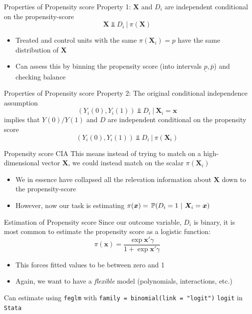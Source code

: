 \documentclass[aspectratio=169,t,11pt,table]{beamer}
\begin{document}
\begin{frame}{Properties of Propensity score}
  Property 1: $\bm{X}$ and $D_i$ are independent conditional on the propensity-score 
  $$
    \bm{X} \Perp D_i \ \vert \ \pi(\bm{X})
  $$
  \begin{itemize}
    \item Treated and control units with the same $\pi(\bm{X}_i) = p$ have the same distribution of $\bm{X}$ 
    \item Can assess this by binning the propensity score (into intervals $\underline{p}, \bar{p}$) and checking balance 
  \end{itemize}
\end{frame}

\begin{frame}{Properties of Propensity score}
  Property 2: The original conditional independence assumption
  $$
    (Y_{i}(0), Y_{i}(1)) \Perp D_i \ \vert \ \bm{X}_i = \bm{x}
  $$
  implies that $Y(0)/Y(1)$ and $D$ are independent conditional on the propensity score
  $$
    (Y_{i}(0), Y_{i}(1)) \Perp D_i \ \vert \ \pi(\bm{X}_i)
  $$
\end{frame}

\begin{frame}{Propensity score CIA}
  This means instead of trying to match on a high-dimensional vector $\bm{X}$, we could instead match on the scalar $\pi(\bm{X}_i)$
  \begin{itemize}
    \item We in essence have collapsed all the relevation information about $\bm{X}$ down to the propensity-score
    
    \item However, now our task is estimating $\pi(\bm{x}) = \prob{D_i = 1}{\bm{X}_i = \bm{x}}$
  \end{itemize}
\end{frame}

\begin{frame}{Estimation of Propensity score}
  Since our outcome variable, $D_i$ is binary, it is most common to estimate the propensity score as a logistic function:
  $$
    \pi(\bm{x}) = \frac{\exp{\bm{x}' \gamma}}{1 + \exp{\bm{x}' \gamma}}
  $$
  \begin{itemize}
    \item This forces fitted values to be between zero and 1
    \item Again, we want to have a \emph{flexible} model (polynomials, interactions, etc.)
  \end{itemize}

  \pause
  \bigskip
  Can estimate using \texttt{feglm} with \texttt{family = binomial(link = "logit")} \texttt{logit} in \texttt{Stata}
\end{frame}
\end{document}
